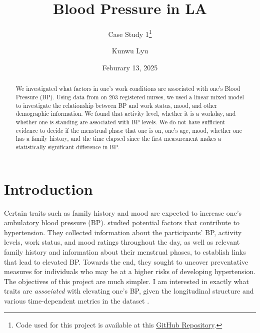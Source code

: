 \documentclass[12pt,twoside,letterpaper]{article}
\title{\textbf{Blood Pressure in LA}}
\subtitle{Case Study 1\footnote{Code used for this project is available at this \href{https://github.com/kwlyu/stat330-w25-case-study-1.git}{GitHub Repository}.}} %
\author{Kunwu Lyu}
\date{Feburary 13, 2025}
\theoremstyle{definition}
\theoremstyle{definition}
\begin{document}
\renewcommand{\abstractname}{Executive Summary}
\maketitle{\vspace{-6ex}}
\expandafter\def\expandafter\normalsize\expandafter{%
    \normalsize%
    \setlength\abovedisplayskip{0pt}%
    \setlength\belowdisplayskip{0pt}%
    \setlength\abovedisplayshortskip{0pt}%
    \setlength\belowdisplayshortskip{0pt}%
}
\singlespacing

\begin{abstract}
    We investigated what factors in one's work conditions are associated with one's Blood Pressure (BP). Using data from \citet{goldstein_ambulatory_2000} on 203 registered nurses, we used a linear mixed model to investigate the relationship between BP and work status, mood, and other demographic information. We found that activity level, whether it is a workday, and whether one is standing are associated with BP levels. We do not have sufficient evidence to decide if the menstrual phase that one is on, one's age, mood, whether one has a family history, and the time elapsed since the first measurement makes a statistically significant difference in BP. 
\end{abstract}

\section{Introduction}\label{sec: intro}

Certain traits such as family history and mood are expected to increase one's ambulatory blood pressure (BP). \citet{goldstein_ambulatory_2000} studied potential factors that contribute to hypertension. They collected information about the participants' BP, activity levels, work status, and mood ratings throughout the day, as well as relevant family history and information about their menstrual phases, to establish links that lead to elevated BP. Towards the end, they sought to uncover preventative measures for individuals who may be at a higher risks of developing hypertension. The objectives of this project are much simpler. I am interested in exactly what traits are \emph{associated} with elevating one's BP, given the longitudinal structure and various time-dependent metrics in the dataset \parencites(given by)()[cited by ]{goldstein_ambulatory_2000}.
\end{document}
